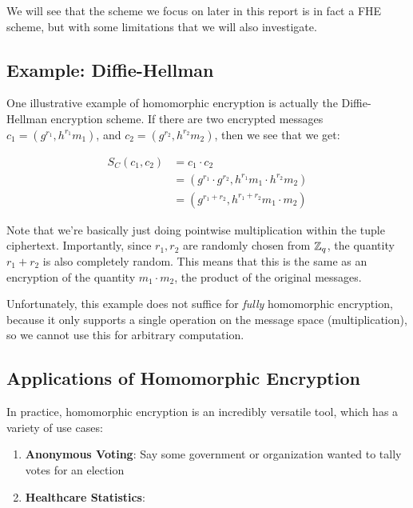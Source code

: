 \documentclass{theme}
\begin{document}


We will see that the scheme we focus on later in this report is in fact a FHE scheme, but with some limitations that we will also investigate.

\subsection{Example: Diffie-Hellman}

One illustrative example of homomorphic encryption is actually the Diffie-Hellman encryption scheme. If there are two encrypted messages $c_1 = (g^{r_1}, h^{r_1} m_1)$, and $c_2 = (g^{r_2}, h^{r_2} m_2)$, then we see that we get:

\begin{align}
    S_C(c_1, c_2) & = c_1 \cdot c_2                                          \\
                  & = (g^{r_1} \cdot g^{r_2}, h^{r_1} m_1 \cdot h^{r_2} m_2) \\
                  & = (g^{r_1 + r_2}, h^{r_1 + r_2} m_1 \cdot m_2)
\end{align}

Note that we're basically just doing pointwise multiplication within the tuple ciphertext. Importantly, since $r_1, r_2$ are randomly chosen from $\mathbb{Z}_q$, the quantity $r_1 + r_2$ is also completely random. This means that this is the same as an encryption of the quantity $m_1 \cdot m_2$, the product of the original messages.

Unfortunately, this example does not suffice for \textit{fully} homomorphic encryption, because it only supports a single operation on the message space (multiplication), so we cannot use this for arbitrary computation.

\subsection{Applications of Homomorphic Encryption}

In practice, homomorphic encryption is an incredibly versatile tool, which has a variety of use cases:

\begin{enumerate}
    \item \textbf{Anonymous Voting}: Say some government or organization wanted to tally votes for an election
    \item \textbf{Healthcare Statistics}:
\end{enumerate}
\end{document}
